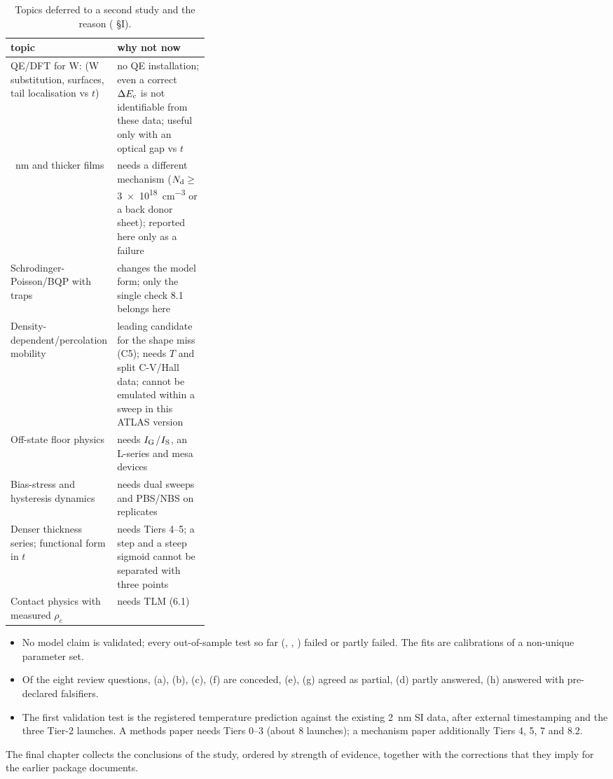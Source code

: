 \begin{table}[tbp]
  \centering
  \footnotesize
  \caption{Topics deferred to a second study and the reason ( \S I).}
  \label{tab:val-second}
  \begin{tabularx}{\linewidth}{>{\raggedright\arraybackslash}p{0.33\linewidth}>{\raggedright\arraybackslash}X}
    \toprule
    topic & why not now \\
    \midrule
    QE/DFT for W:\InO{} (W substitution, surfaces, tail localisation vs $t$) & no QE installation; even a correct $\Delta E_{\mathrm{c}}$ is not identifiable from these data; useful only with an optical gap vs $t$ \\
    31.8~nm and thicker films & needs a different mechanism ($N_{\mathrm{d}}\ge$\SI{3e18}{cm^{-3}} or a back donor sheet); reported here only as a failure \\
    Schrodinger-Poisson/BQP with traps & changes the model form; only the single check 8.1 belongs here \\
    Density-dependent/percolation mobility & leading candidate for the shape miss (C5); needs $T$ and split C-V/Hall data; cannot be emulated within a sweep in this ATLAS version \\
    Off-state floor physics & needs $I_{\mathrm{G}}$/$I_{\mathrm{S}}$, an L-series and mesa devices \\
    Bias-stress and hysteresis dynamics & needs dual sweeps and PBS/NBS on replicates \\
    Denser thickness series; functional form in $t$ & needs Tiers 4--5; a step and a steep sigmoid cannot be separated with three points \\
    Contact physics with measured $\rho_c$ & needs TLM (6.1) \\
    \bottomrule
  \end{tabularx}
\end{table}

\begin{keyresult}[title={Key result: validation status}]
\begin{itemize}
  \item No model claim is validated; every out-of-sample test so far (, , ) failed or partly failed. The fits are calibrations of a non-unique parameter set.
  \item Of the eight review questions, (a), (b), (c), (f) are conceded, (e), (g) agreed as partial, (d) partly answered, (h) answered with pre-declared falsifiers.
  \item The first validation test is the registered temperature prediction against the existing 2~nm SI data, after external timestamping and the three Tier-2 launches. A methods paper needs Tiers 0--3 (about 8 launches); a mechanism paper additionally Tiers 4, 5, 7 and 8.2.
\end{itemize}
\end{keyresult}

The final chapter collects the conclusions of the study, ordered by strength of evidence, together with the corrections that they imply for the earlier package documents.
